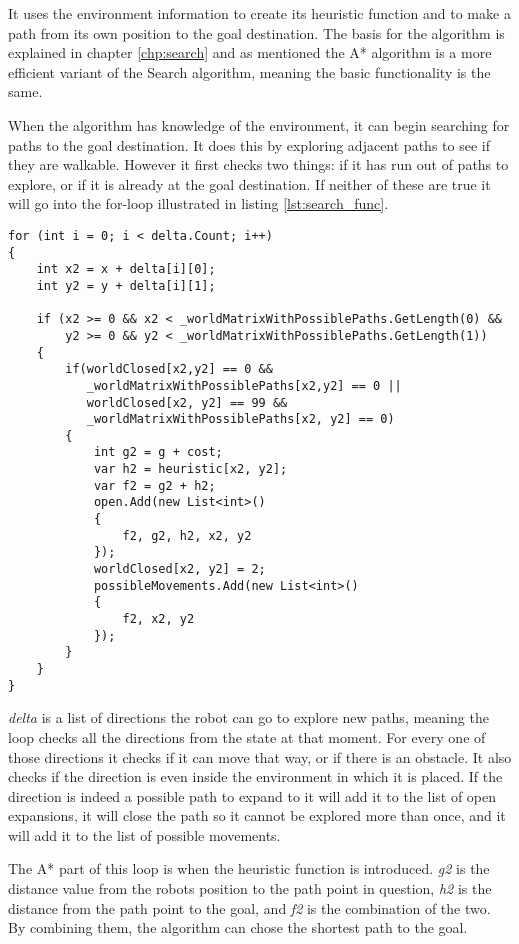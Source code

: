 It uses the environment information to create its heuristic function and to make a path from its own position to the goal destination. The basis for the algorithm is explained in chapter \ref{chp:search} and as mentioned the A* algorithm is a more efficient variant of the Search algorithm, meaning the basic functionality is the same. 

When the algorithm has knowledge of the environment, it can begin searching for paths to the goal destination. It does this by exploring adjacent paths to see if they are walkable. However it first checks two things: if it has run out of paths to explore, or if it is already at the goal destination. If neither of these are true it will go into the for-loop illustrated in listing \ref{lst:search_func}. 

\lstset{style=sharpc}
\begin{lstlisting}[caption={Functionality of Search}, label=lst:search_func, mathescape=true]             
for (int i = 0; i < delta.Count; i++)
{
	int x2 = x + delta[i][0];
	int y2 = y + delta[i][1];

	if (x2 >= 0 && x2 < _worldMatrixWithPossiblePaths.GetLength(0) && 
	    y2 >= 0 && y2 < _worldMatrixWithPossiblePaths.GetLength(1))
	{
		if(worldClosed[x2,y2] == 0 && 
		   _worldMatrixWithPossiblePaths[x2,y2] == 0 || 
		   worldClosed[x2, y2] == 99 && 
		   _worldMatrixWithPossiblePaths[x2, y2] == 0)
		{
			int g2 = g + cost;
			var h2 = heuristic[x2, y2];
			var f2 = g2 + h2;
			open.Add(new List<int>()
			{
				f2, g2, h2, x2, y2
			});
			worldClosed[x2, y2] = 2;
			possibleMovements.Add(new List<int>()
			{
				f2, x2, y2
			});
		}
	}
}
\end{lstlisting}

\emph{delta} is a list of directions the robot can go to explore new paths, meaning the loop checks all the directions from the state at that moment. For every one of those directions it checks if it can move that way, or if there is an obstacle. It also checks if the direction is even inside the environment in which it is placed. If the direction is indeed a possible path to expand to it will add it to the list of open expansions, it will close the path so it cannot be explored more than once, and it will add it to the list of possible movements.

The A* part of this loop is when the heuristic function is introduced. \emph{g2} is the distance value from the robots position to the path point in question, \emph{h2} is the distance from the path point to the goal, and \emph{f2} is the combination of the two. By combining them, the algorithm can chose the shortest path to the goal.

